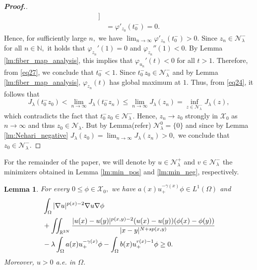 \documentclass[11pt]{article}
\newtheorem{lemma}{Lemma}[section] %
\newcommand{\X}{\mathcal{X}_{0}}
\newcommand{\Nh}{\mathcal{N}_\la}
\newcommand{\lmt}{\lim_{n\to\infty}}
\newcommand{\ga} {\gamma}
\newcommand{\om} {\Omega}
\newcommand{\la} {\lambda}
\newcommand{\na} {\nabla}
\newcommand{\ds} {\displaystyle}
\newcommand{\grad}{\nabla}
\begin{document}
\begin{proof}[\bf Proof.]
\begin{align}
\Big ]\nonumber\\
        &=\varphi'_{z_0}(t_0^-)=0.
    \end{align}
    Hence, for sufficiently large $n,$
we have $\ds \lmt \varphi'_{z_n}(t_0^-)>0.$
Since $z_n\in \Nh^-$
for all $n\in\mathbb{N},$
it holds that $\varphi_{z_n}'(1)=0$
and $\varphi_{z_n}''(1)<0.$
By Lemma \ref{lm:fiber_map_analysis}, 
this implies that $\varphi_{u_n}'(t)<0$
for all $t>1.$
Therefore, from \eqref{eq27}, 
we conclude that $t_0^-<1.$
Since $t_0^-z_0\in\Nh^-$
and by Lemma \ref{lm:fiber_map_analysis}, 
$\varphi_{z_n}(t)$
has global maximum at $1.$
Thus, from \eqref{eq24}, 
it follows that
$$
J_\la(t_0^-z_0)<\lmt J_\la(t_0^-z_n)
\le 
\lmt J_\la(z_n)=\inf_{z\in\Nh^-}J_\la(z),
$$
which contradicts the fact that 
$t_0^-z_0\in\Nh^-.$
Hence, $z_n\rightarrow z_0$
strongly in $\X$
as $n\to\infty$
and thus $z_0\in\Nh.$
But by Lemma(refer) $\Nh^0=\{0\}$
and since by Lemma \ref{lm:Nehari_negative} 
$J_\la(z_0)=\ds \lmt J_\la(z_n)>0,$
we conclude that $z_0\in\Nh^-.$
\end{proof}


For the remainder of the paper, 
we will denote by $u\in \Nh^+$
and $v\in\Nh^-$
the minimizers obtained in Lemma 
\ref{lm:min_pos} and \ref{lm:min_neg}, 
respectively.


\begin{lemma}
    For every $0\le\phi\in\X,$
we have $a(x)u_+^{-\ga(x)}\phi\in L^1(\om)$
and 
\begin{align}\label{eq16}
&
\int_\om|\grad u|^{p(x)-2}\na u\na\phi \notag \\
& +
 \iint_{\mathbb{R}^{2N}} 
\frac{|u(x)-u(y)|^{p(x,y)-2}(u(x)-u(y))
(\phi(x)-\phi(y))}{|x-y|^{N+sp(x,y)}}\nonumber\\
    &-\la
\int_\om a(x)u_+^{-\ga(x)}\phi -
\int_\om b(x)u_+^{r(x)-1}\phi\ge0.
    \end{align}
    Moreover, $u>0$
a.e. in $\om$.
\end{lemma}
\end{document}

